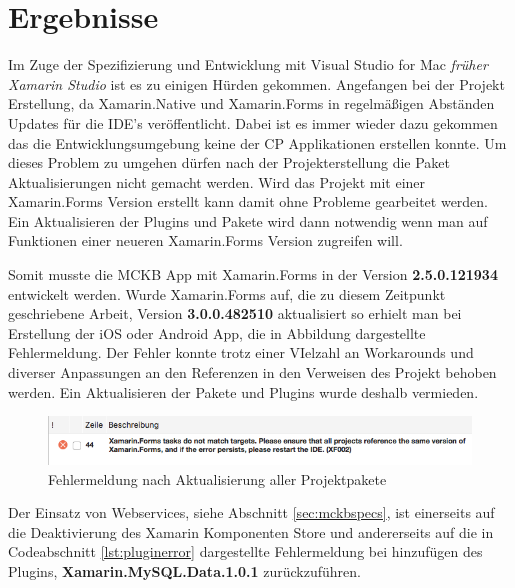 %
%
% 
% 


\chapter{Ergebnisse}
\label{chap:xamarinformsresults}

	Im Zuge der Spezifizierung und Entwicklung mit Visual Studio for Mac \textit{früher Xamarin Studio} ist es zu einigen Hürden gekommen. Angefangen bei der Projekt Erstellung, da Xamarin.Native und Xamarin.Forms in regelmäßigen Abständen Updates für die IDE's veröffentlicht. Dabei ist es immer wieder dazu gekommen das die Entwicklungsumgebung keine der CP Applikationen erstellen konnte. Um dieses Problem zu umgehen dürfen nach der Projekterstellung die Paket Aktualisierungen nicht gemacht werden. Wird das Projekt mit einer Xamarin.Forms Version erstellt kann damit ohne Probleme gearbeitet werden. Ein Aktualisieren der Plugins und Pakete wird dann notwendig wenn man auf Funktionen einer neueren Xamarin.Forms Version zugreifen will.

	Somit musste die MCKB App mit Xamarin.Forms in der Version \textbf{2.5.0.121934} entwickelt werden. Wurde Xamarin.Forms auf, die zu diesem Zeitpunkt geschriebene Arbeit, Version \textbf{3.0.0.482510} aktualisiert so erhielt man bei Erstellung der iOS oder Android App, die in Abbildung dargestellte Fehlermeldung. Der Fehler konnte trotz einer VIelzahl an Workarounds und diverser Anpassungen an den Referenzen in den Verweisen des Projekt behoben werden. Ein Aktualisieren der Pakete und Plugins wurde deshalb vermieden.

	\begin{figure}[h!]
		\centering
		\includegraphics[width=1\textwidth]{images/Xamarin-Upgrade-Error.png}
		\caption{Fehlermeldung nach Aktualisierung aller Projektpakete}
		\label{fig:xamarinbuilderror}
	\end{figure}

	\newpage
	Der Einsatz von Webservices, siehe Abschnitt \ref{sec:mckbspecs}, ist einerseits auf die Deaktivierung des Xamarin Komponenten Store und andererseits auf die in Codeabschnitt \ref{lst:pluginerror} dargestellte Fehlermeldung bei hinzufügen des Plugins, \textbf{Xamarin.MySQL.Data.1.0.1} zurückzuführen.

